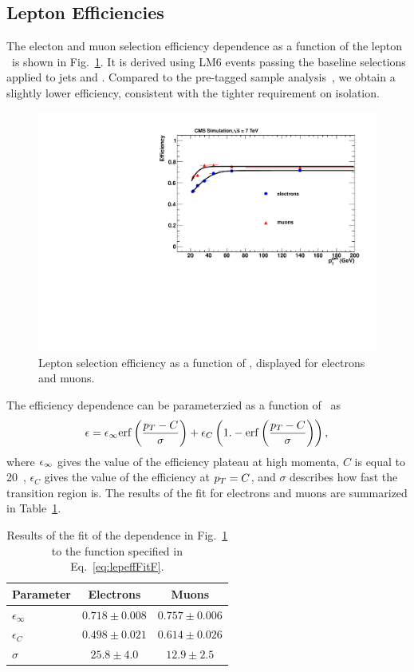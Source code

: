 \subsection{Lepton Efficiencies}
\label{sec:lepeff}
%
The electon and muon selection efficiency dependence as a function of the lepton \pt\
is shown in Fig.~\ref{fig:lepeffLM6}.
It is derived using LM6 events passing the baseline selections applied to jets and \met.
Compared to the pre-tagged sample analysis~\cite{ssnote2011}, we obtain a slightly
lower efficiency, consistent with the tighter requirement on isolation.

\begin{figure}[h]
\begin{center}
\includegraphics[width=0.7\linewidth]{figs/leptonEfficiency_lm6}
\caption{\label{fig:lepeffLM6}
Lepton selection efficiency as a function of \pt,
displayed for electrons and muons.
}
\end{center}
\end{figure}

%
The efficiency dependence can be parameterzied as a function of \pt\ as 
%
\begin{eqnarray}
\epsilon = \epsilon_{\rm \infty} {\rm erf}\left ( \frac{p_T - C}{\sigma} \right)
	+ \epsilon_C \left( 1.- {\rm erf}\left ( \frac{p_T - C}{\sigma} \right) \right),
\label{eq:lepeffFitF}
\end{eqnarray}
where $\epsilon_{\rm \infty}$ gives the value of the efficiency plateau at high momenta,
$C$ is equal to 20~\GeV,
$\epsilon_C$ gives the value of the efficiency at $p_T=C$,
and $\sigma$ describes how fast the transition region is.
The results of the fit for electrons and muons are summarized in Table~\ref{tab:lepeffLM6fit}.
%
\begin{table}[h]
\begin{center}
\caption{\label{tab:lepeffLM6fit} Results of the fit of the dependence in Fig.~\ref{fig:lepeffLM6}
to the function specified in Eq.~\ref{eq:lepeffFitF}.}
\begin{tabular}{l|cc}\hline\hline
Parameter		& Electrons		& Muons			\\ \hline
$\epsilon_{\infty}$	& $0.718\pm0.008$	& $0.757\pm0.006$	\\
$\epsilon_{C}$		& $0.498\pm0.021$	& $0.614\pm0.026$	\\
$\sigma$		& $25.8\pm4.0$		& $12.9\pm2.5$		\\
\hline\hline
\end{tabular}
\end{center}
\end{table}

